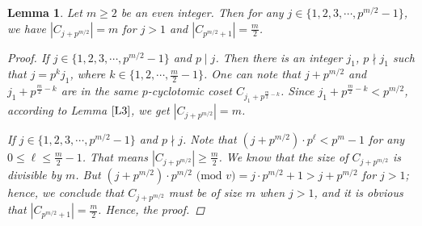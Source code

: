 \documentclass[pdflatex,sn-mathphys-num]{sn-jnl}%
\newtheorem{lemma}{Lemma}
\theoremstyle{thmstyleone}%
\theoremstyle{thmstyletwo}%
\theoremstyle{thmstylethree}%
\begin{document}
\begin{lemma}\label{L17}
    Let $m\geq 2$ be an even integer. Then for any $j\in\{1,2,3,\cdots,p^{m/2}-1\}$, we have
     $|C_{j+p^{m/2}}|=m$ for $j>1$ and $|C_{p^{m/2}+1}|=\frac{m}{2}$.   
    \begin{proof}
        If $j\in\{1,2,3,\cdots,p^{m/2}-1\}$ and $p\mid j$. Then there is an integer $j_{1}$, $p\nmid j_{1}$ such that $j=p^{k}j_{1}$, where $k\in\{1,2,\cdots,\frac{m}{2}-1\}$. One can note that $j+p^{m/2}$ and $j_{1}+p^{\frac{m}{2}-k}$ are in the same $p$-cyclotomic coset $C_{j_{1}+p^{\frac{m}{2}-k}}$. Since $j_{1}+p^{\frac{m}{2}-k}<p^{m/2}$, according to Lemma $\ref{L3}$, we get  $|C_{j+p^{m/2}}|=m$. 
        \par If $j\in\{1,2,3,\cdots,p^{m/2}-1\}$ and $p\nmid j$. Note that $(j+p^{m/2})\cdot p^{\ell}<p^{m}-1$ for any $0\leq\ell\leq\frac{m}{2}-1$. That means $|C_{j+p^{m/2}}|\geq\frac{m}{2}$. We know that the size of $C_{j+p^{m/2}}$ is divisible by $m$. But $(j+p^{m/2})\cdot p^{m/2}\text{ (mod $v$)}= j\cdot p^{m/2}+1>j+p^{m/2}$ for $j>1$; hence, we conclude that $C_{j+p^{m/2}}$ must be of size $m$ when $j>1$, and it is obvious that $|C_{p^{m/2}+1}|=\frac{m}{2}$. Hence, the proof.
    \end{proof}
\end{lemma}
\end{document}
